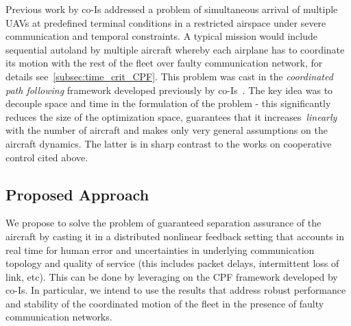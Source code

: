 \documentclass[letter,onecolumn,12pt]{aiaa-tc}
\newcommand{\1}{1_n}
\begin{document}
Previous work by co-Is addressed a problem of simultaneous arrival of multiple UAVs at predefined terminal conditions
in a restricted airspace under severe communication and temporal constraints. A typical mission would include sequential
autoland by multiple aircraft whereby each airplane has to coordinate its motion with the rest of the fleet over faulty communication network, for details see~\ref{subsec:time_crit_CPF}. This problem was cast in the {\it coordinated path
following} framework developed previously by co-Is~\cite{CSM12_CPF}. The key idea was to decouple space and time in
the formulation of the problem - this significantly reduces the size of the optimization space, guarantees that it
increases~\emph{linearly} with the number of aircraft and makes only very general assumptions on the aircraft dynamics.
The latter is in sharp contrast to the works on cooperative control cited above.

\subsection{Proposed Approach}
We propose to solve the problem of guaranteed separation assurance of the aircraft by casting it in a distributed nonlinear feedback setting that accounts in real time for human error and uncertainties in underlying communication topology and quality of service (this includes packet delays, intermittent loss of link, etc).  This can be done by leveraging  on the CPF framework developed by co-Is.  In particular, we intend to use the results that address robust performance and stability of the coordinated motion of the fleet in the presence of faulty communication networks.
\end{document}
